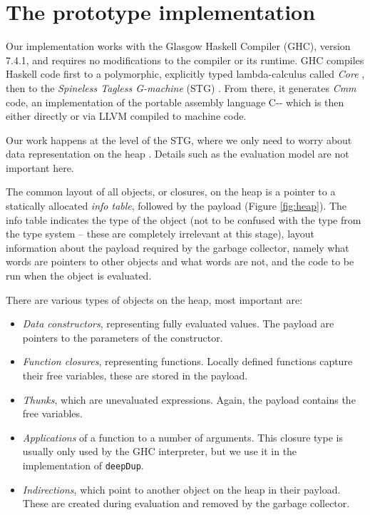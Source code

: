\documentclass[preprint]{sigplanconf}
\theoremstyle{nonumberplain}
\newcommand{\li}{\lstinline[style=Haskell]}
\begin{document}
\section{The prototype implementation}

Our implementation works with the Glasgow Haskell Compiler (GHC), version 7.4.1, and requires no modifications to the compiler or its runtime. GHC compiles Haskell code first to a polymorphic, explicitly typed lambda-calculus called \emph{Core} \citep{core,system-fc}, then to the \emph{Spineless Tagless G-machine} (STG) \citep{stg}. From there, it generates \emph{Cmm} code, an implementation of the portable assembly language C-{}- which is then either directly or via LLVM compiled to machine code.

Our work happens at the level of the STG, where we only need to worry about data representation on the heap \citep{stg}. Details such as the evaluation model \cite{evalapply} are not important here.

The common layout of all objects, or closures,  on the heap is a pointer to a statically allocated \emph{info table}, followed by the payload (Figure \ref{fig:heap}). The info table indicates the type of the object (not to be confused with the type from the type system – these are completely irrelevant at this stage), layout information about the payload required by the garbage collector, namely what words are pointers to other objects and what words are not, and the code to be run when the object is evaluated.

There are various types of objects on the heap, most important are:
\begin{itemize}
\item \emph{Data constructors}, representing fully evaluated values. The payload are pointers to the parameters of the constructor.
\item \emph{Function closures}, representing functions. Locally defined functions capture their free variables, these are stored in the payload.
\item \emph{Thunks}, which are unevaluated expressions. Again, the payload contains the free variables.
\item \emph{Applications} of a function to a number of arguments. This closure type is usually only used by the GHC interpreter, but we use it in the implementation of \li-deepDup-.
\item \emph{Indirections}, which point to another object on the heap in their payload. These are created during evaluation and removed by the garbage collector.
\end{itemize}
\end{document}
